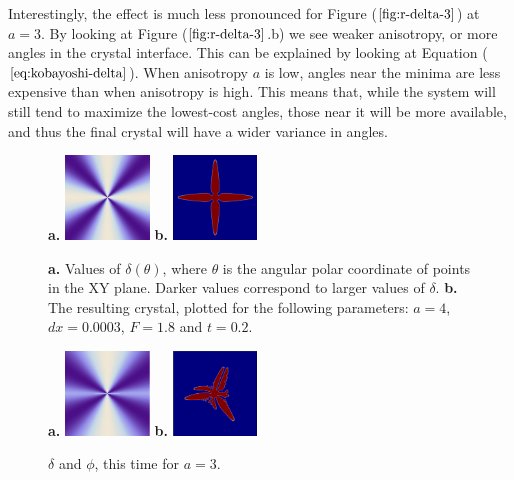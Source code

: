 \documentclass[10pt]{article} %
\begin{document}
Interestingly, the effect is much less pronounced for Figure ($\ref{fig:r-delta-3}$) at $a=3$. By looking at Figure ($\ref{fig:r-delta-3}$.b) we see weaker anisotropy, or more angles in the crystal interface. This can be explained by looking at Equation ($\ref{eq:kobayoshi-delta}$). When anisotropy $a$ is low, angles near the minima are less expensive than when anisotropy is high. This means that, while the system will still tend to maximize the lowest-cost angles, those near it will be more available, and thus the final crystal will have a wider variance in angles.\\

\begin{figure}[h!]
  \centering
  \textbf{a. }\includegraphics[width=0.2\textwidth]{../radial-anisotropy-4.png}
  \hspace{1cm}\textbf{b. }\includegraphics[width=0.2\textwidth]{../anis-4.png}
  \caption{\textbf{a.} Values of $\delta(\theta)$, where $\theta$ is the angular polar coordinate of points in the XY plane. Darker values correspond to larger values of $\delta$. \textbf{b.} The resulting crystal, plotted for the following parameters: $a=4$,$dx=0.0003$, $F=1.8$ and $t=0.2$.}
  \label{fig:r-delta-4}
\end{figure}

\begin{figure}[h!]
  \centering
  \textbf{a. }\includegraphics[width=0.2\textwidth]{../radial-anisotropy-3.png}
  \hspace{1cm}\textbf{b. }\includegraphics[width=0.2\textwidth]{../anis-3.png}
  \caption{$\delta$ and $\phi$, this time for $a=3$.}
  \label{fig:r-delta-3}
\end{figure}
\end{document}
